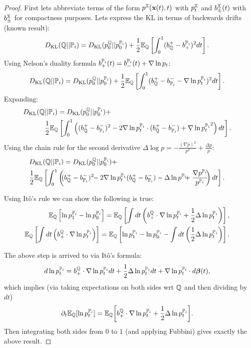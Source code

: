 \documentclass[a4paper,12pt,twoside,openright]{report}
\theoremstyle{definition}
\begin{document}
\begin{proof}
First lets  abbreviate  terms of the form $p^{\X}(\rvx(t), t)$ with $p^{\X}_t$ and $b^{\X}_{\pm}(t)$ with $b^{\X}_{\pm}$ for compactness purposes. Lets express the KL in terms of backwards drifts (known result):
\begin{align}
\KL(\Q||{\P_{i}}) = \KL( p_0^{\Q}|| p_0^{{\P_{i}}}) + \frac{1}{2}\E_{\Q}\left[\int_0^1 ( b_\Q^{+} - b^{\P_{i}}_{+})^2 dt\right].
\end{align}
Using Nelson's duality formula $b^{\P_{i}}_+(t) =b^{\P_{i}}_-(t) + \nabla\log p_t$:
\begin{align}
\KL(\Q||{\P_{i}}) = \KL( p_0^{\Q}|| p_0^{{\P_{i}}}) + \frac{1}{2}\E_{\Q}\left[\int_0^1 ( b_\Q^{+} - b_{\P_{i}}^{-} - \nabla\log p_t^{\P_{i}})^2 dt\right].
\end{align}
Expanding:
\begin{align*}
\KL(\Q&||{\P_{i}}) = \KL( p_0^{\Q}|| p_0^{{\P_{i}}}) +\\ &\frac{1}{2}\E_{\Q}\left[\int_0^1 \left(( b_\Q^{+} - b_{\P_{i}}^{-})^2 - 2\nabla\log p_t^{\P_{i}} \cdot ( b_\Q^{+} - b_{\P_{i}}^{-}) + {\nabla\log p_t^{\P_{i}}}^2 \right)dt\right].
\end{align*}
Using the chain rule for the second derivative $\Delta \log  p = -\frac{(\nabla p)^2}{ p^2}  + \frac{\Delta  p}{ p}$:
\begin{align*}
&\KL(\Q||{\P_{i}}) =\KL( p_0^{\Q}|| p_0^{{\P_{i}}}) +\\ &\frac{1}{2}\E_{\Q}\left[\int_0^1 \left(\!\!( b_\Q^{+} - b_{\P_{i}}^{-})^2 \!\!- 2\nabla\log p_t^{\P_{i}}\!\!\!\cdot \!( b_\Q^{+} - b_{\P_{i}}^{-}) - \Delta \log  p^{\P_{i}}\!\!\!+ \frac{\nabla  p^{\P_{i}}}{ p^{\P_{i}}}\!\!\right)dt\right].
\end{align*}

Using Itô's rule we can show the following is true: 
\begin{align*}
\E_\Q\left[\log p^{\P_{i}}_1-\log p^{\P_{i}}_0\right] = \E_\Q\left[\int dt \left(b_+^\Q\cdot\nabla\log p_t^{\P_{i}} + \frac{1}{2}\Delta \log p_t^{\P_{i}}\right)\right],\\
\E_\Q\left[\int dt \left(b_+^\Q\cdot\nabla\log p_t^{\P_{i}} \right)\right] = \E_\Q\left[\log p^{\P_{i}}_1-\log p^{\P_{i}}_0 - \int dt \left( \frac{1}{2}\Delta \log p_t^{\P_{i}}\right)\right].
\end{align*}

The above step is arrived to via Itô's formula:
\begin{align*}
d\log  p_t^{{\P_{i}}} = b_+^\Q\cdot\nabla\log p_t^{\P_{i}} dt + \frac{1}{2}\Delta \log p_t^{\P_{i}} dt + \nabla \log p_t^{\P_{i}} \cdot d\rvw(t),
\end{align*}
which implies (via taking expectations on both sides wrt $\Q$ and then dividing by $dt$)
\begin{align*}
\partial_t \E_{\Q}[\log  p_t^{{\P_{i}}}] = \E_{\Q}{\left[b_+^\Q\cdot\nabla\log p_t^{\P_{i}} + \frac{1}{2}\Delta \log p_t^{\P_{i}}\right]}.
\end{align*}
Then integrating both sides from $0$ to $1$ (and applying Fubbini) gives exactly the above result.


\end{proof}
\end{document}

